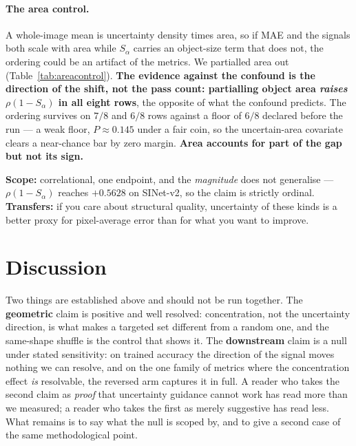 \documentclass{article} %
\begin{document}
\paragraph{The area control.} A whole-image mean is uncertainty density times area, so if MAE and
the signals both scale with area while $S_\alpha$ carries an object-size term that does not, the
ordering could be an artifact of the metrics. We partialled area out
(Table~\ref{tab:areacontrol}). \textbf{The evidence against the confound is the direction of the
shift, not the pass count: partialling object area \emph{raises} $\rho(1-S_\alpha)$ in all eight
rows}, the opposite of what the confound predicts. The ordering survives on $7/8$ and $6/8$ rows
against a floor of $6/8$ declared before the run --- a weak floor, $P \approx 0.145$ under a fair
coin, so the uncertain-area covariate clears a near-chance bar by zero margin. \textbf{Area accounts
for part of the gap but not its sign.}

\textbf{Scope:} correlational, one endpoint, and the \emph{magnitude} does not generalise ---
$\rho(1-S_\alpha)$ reaches $+0.5628$ on SINet-v2, so the claim is strictly ordinal.
\textbf{Transfers:} if you care about structural quality, uncertainty of these kinds is a better
proxy for pixel-average error than for what you want to improve.

\section{Discussion}
\label{sec:dissection}

Two things are established above and should not be run together. The \textbf{geometric} claim is
positive and well resolved: concentration, not the uncertainty direction, is what makes a targeted
set different from a random one, and the same-shape shuffle is the control that shows it. The
\textbf{downstream} claim is a null under stated sensitivity: on trained accuracy the direction of
the signal moves nothing we can resolve, and on the one family of metrics where the concentration
effect \emph{is} resolvable, the reversed arm captures it in full. A reader who takes the second
claim as \emph{proof} that uncertainty guidance cannot work has read more than we measured; a
reader who takes the first as merely suggestive has read less. What remains is to say what the
null is scoped by, and to give a second case of the same methodological point.
\end{document}
